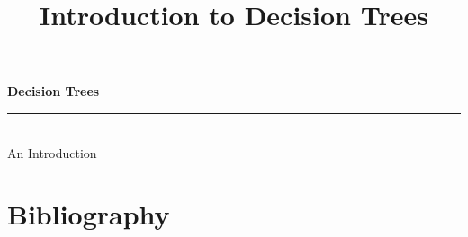 






%

\title{Introduction to Decision Trees}



\begin{titlepage} 
\thispagestyle{empty}



\begin{center}
    {\fontsize{60}{60} \bfseries \textsf{Decision Trees}}\\[1em]
        
    \noindent\rule{\textwidth}{0.5pt} \\[1em]
    {\Large \textsf{An Introduction} } \\[4em]
    
    \vspace{5em}

\end{center}

\end{titlepage}

\newpage






\setcounter{section}{0}
\renewcommand{\thesection}{\Alph{section}}



\newpage

\section{Bibliography}
\printbibliography[heading=none]







